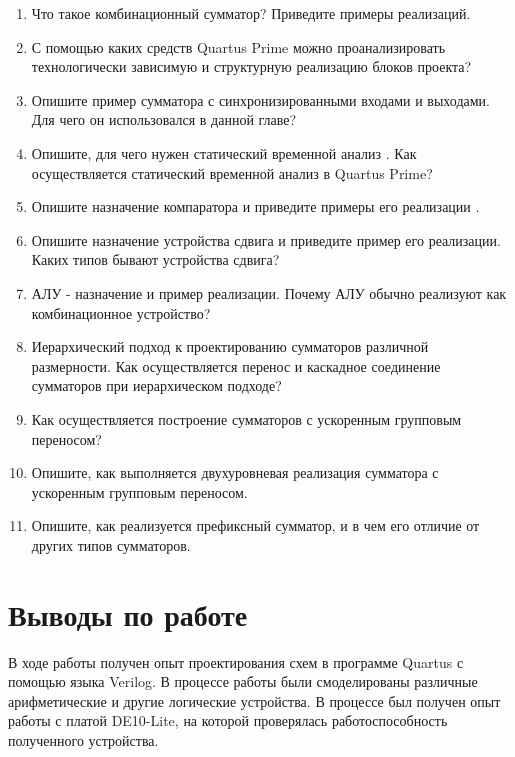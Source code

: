 \documentclass[a4paper,14pt]{article}
\begin{document}
	\begin{enumerate}
		\item Что такое комбинационный сумматор? Приведите примеры реализаций.
		
		\item С помощью каких средств Quartus Prime можно проанализировать технологически
		зависимую и структурную реализацию блоков проекта?
		
		\item Опишите пример сумматора с синхронизированными входами и выходами. Для чего
		он использовался в данной главе?
		
		\item Опишите, для чего нужен статический временной анализ . Как осуществляется
		статический временной анализ в Quartus Prime?
		
		\item Опишите назначение компаратора и приведите примеры его реализации .
		
		\item Опишите назначение устройства сдвига и приведите пример его реализации. Каких
		типов бывают устройства сдвига?
		
		\item АЛУ - назначение и пример реализации. Почему АЛУ обычно реализуют как
		комбинационное устройство?
		
		\item Иерархический подход к проектированию сумматоров различной размерности. Как
		осуществляется перенос и каскадное соединение сумматоров при иерархическом
		подходе?
		
		\item Как осуществляется построение сумматоров с ускоренным групповым переносом?
		
		\item Опишите, как выполняется двухуровневая реализация сумматора с ускоренным
		групповым переносом.
		
		\item Опишите, как реализуется префиксный сумматор, и в чем его отличие от других типов
		сумматоров.
		
	\end{enumerate}
	
	\section{Выводы по работе}
	
	В ходе работы получен опыт проектирования схем в программе Quartus с помощью языка Verilog.
	В процессе работы были смоделированы различные арифметические и другие логические устройства.
	В процессе был получен опыт работы с платой DE10-Lite, на которой проверялась работоспособность полученного устройства.
	
\end{document}

